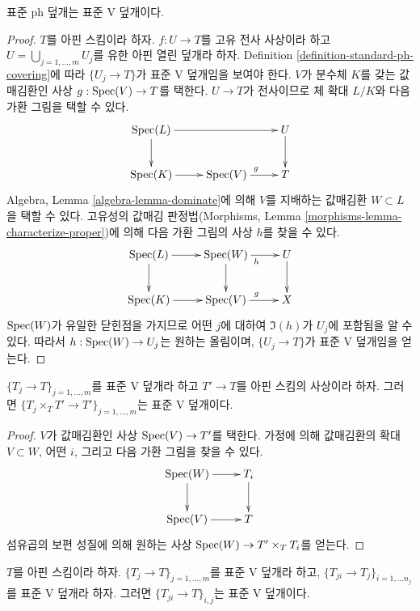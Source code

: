 \begin{lemma}
\label{lemma-standard-ph-standard-V}
표준 ph 덮개는 표준 V 덮개이다.
\end{lemma}

\begin{proof}
$T$를 아핀 스킴이라 하자. $f : U \to T$를 고유 전사 사상이라 하고
$U = \bigcup_{j = 1, \ldots, m} U_j$를 유한 아핀 열린 덮개라 하자.
Definition \ref{definition-standard-ph-covering}에 따라
$\{U_j \to T\}$가 표준 V 덮개임을 보여야 한다. $V$가 분수체 $K$를 갖는
값매김환인 사상 $g : \mathop{\mathrm{Spec}}(V) \to T$를 택한다. $U \to T$가 전사이므로
체 확대 $L/K$와 다음 가환 그림을 택할 수 있다.
$$
\xymatrix{
\Spec(L) \ar[rr] \ar[d] & & U \ar[d] \\
\Spec(K) \ar[r] & \Spec(V) \ar[r]^g & T
}
$$
Algebra, Lemma \ref{algebra-lemma-dominate}에 의해 $V$를 지배하는 값매김환
$W \subset L$을 택할 수 있다. 고유성의 값매김 판정법(Morphisms, Lemma
\ref{morphisms-lemma-characterize-proper})에 의해 다음 가환 그림의 사상
$h$를 찾을 수 있다.
$$
\xymatrix{
\Spec(L) \ar[r] \ar[d] & \Spec(W) \ar[r]_h \ar[d] & U \ar[d] \\
\Spec(K) \ar[r] & \Spec(V) \ar[r]^g & X
}
$$
$\mathop{\mathrm{Spec}}(W)$가 유일한 닫힌점을 가지므로 어떤 $j$에 대하여
$\Im(h)$가 $U_j$에 포함됨을 알 수 있다. 따라서
$h : \mathop{\mathrm{Spec}}(W) \to U_j$는 원하는 올림이며, $\{U_j \to T\}$가 표준 V
덮개임을 얻는다.
\end{proof}

\begin{lemma}
\label{lemma-base-change-standard-V}
$\{T_j \to T\}_{j = 1, \ldots, m}$를 표준 V 덮개라 하고
$T' \to T$를 아핀 스킴의 사상이라 하자. 그러면
$\{T_j \times_T T' \to T'\}_{j = 1, \ldots, m}$는 표준 V 덮개이다.
\end{lemma}

\begin{proof}
$V$가 값매김환인 사상 $\mathop{\mathrm{Spec}}(V) \to T'$를 택한다. 가정에 의해 값매김환의
확대 $V \subset W$, 어떤 $i$, 그리고 다음 가환 그림을 찾을 수 있다.
$$
\xymatrix{
\Spec(W) \ar[r] \ar[d] & T_i \ar[d] \\
\Spec(V) \ar[r] & T
}
$$
섬유곱의 보편 성질에 의해 원하는 사상
$\mathop{\mathrm{Spec}}(W) \to T' \times_T T_i$를 얻는다.
\end{proof}

\begin{lemma}
\label{lemma-composition-standard-V}
$T$를 아핀 스킴이라 하자. $\{T_j \to T\}_{j = 1, \ldots, m}$를 표준 V
덮개라 하고, $\{T_{ji} \to T_j\}_{i = 1, \ldots n_j}$를 표준 V 덮개라
하자. 그러면 $\{T_{ji} \to T\}_{i, j}$는 표준 V 덮개이다.
\end{lemma}

